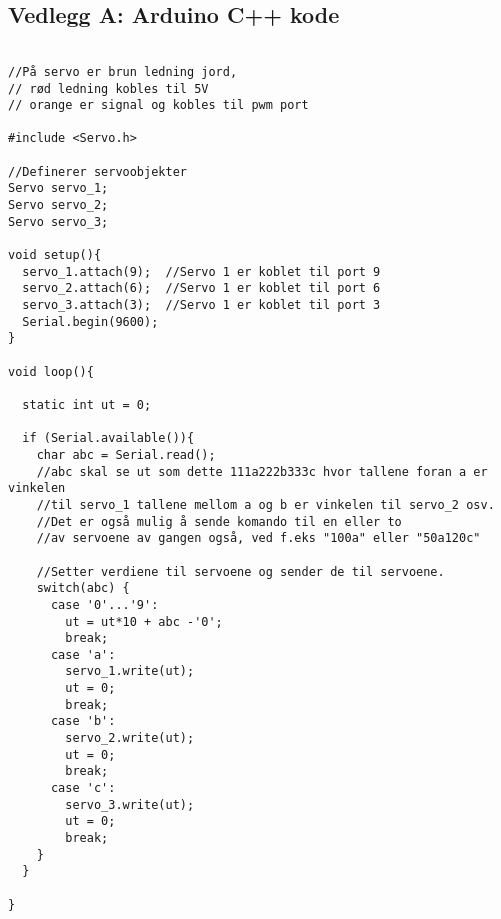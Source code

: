\subsection{Vedlegg A: Arduino C++ kode}

\begin{frame}

\begin{spacing}{0.85}
\begin{lstlisting}

//På servo er brun ledning jord, 
// rød ledning kobles til 5V 
// orange er signal og kobles til pwm port

#include <Servo.h>

//Definerer servoobjekter
Servo servo_1; 
Servo servo_2;
Servo servo_3;

void setup(){
  servo_1.attach(9);  //Servo 1 er koblet til port 9
  servo_2.attach(6);  //Servo 1 er koblet til port 6
  servo_3.attach(3);  //Servo 1 er koblet til port 3
  Serial.begin(9600);
}

void loop(){
  
  static int ut = 0;
  
  if (Serial.available()){
    char abc = Serial.read(); 
    //abc skal se ut som dette 111a222b333c hvor tallene foran a er vinkelen 
    //til servo_1 tallene mellom a og b er vinkelen til servo_2 osv.
    //Det er også mulig å sende komando til en eller to 
    //av servoene av gangen også, ved f.eks "100a" eller "50a120c"
    
    //Setter verdiene til servoene og sender de til servoene.
    switch(abc) {
      case '0'...'9':
        ut = ut*10 + abc -'0';
        break;
      case 'a':
        servo_1.write(ut);
        ut = 0;
        break;
      case 'b':
        servo_2.write(ut);
        ut = 0;
        break;
      case 'c':
        servo_3.write(ut);
        ut = 0;
        break;
    }
  }
  
}  

\end{lstlisting}
\end{spacing}
\end{frame}
